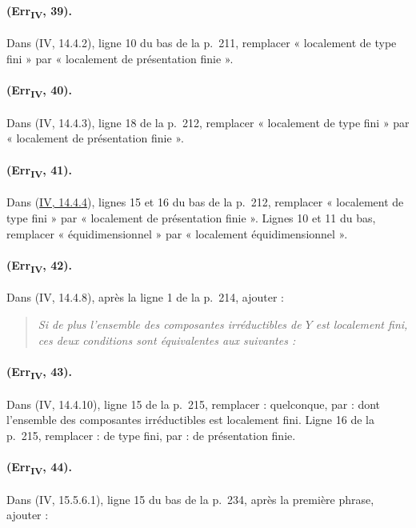 \paragraph{(Err\textsubscript{IV}, 39).}
Dans (IV, 14.4.2), ligne 10 du bas de la p.~211, remplacer « localement
de type fini » par « localement de présentation finie ».

\paragraph{(Err\textsubscript{IV}, 40).}
Dans (IV, 14.4.3), ligne 18 de la p.~212, remplacer « localement de
type fini » par « localement de présentation finie ».

\paragraph{(Err\textsubscript{IV}, 41).}
Dans ({\hyperlink{ega4.c04.cor.14-4-4}{IV, 14.4.4}}), lignes 15 et 16 du
bas de la p.~212, remplacer « localement de type fini » par
« localement de présentation finie ». Lignes 10 et 11 du bas, remplacer
« équidimensionnel » par « localement équidimensionnel ».

\paragraph{(Err\textsubscript{IV}, 42).}
Dans (IV, 14.4.8), après la ligne 1 de la p.~214, ajouter :
\begin{quote}
\emph{Si de plus l'ensemble des composantes irréductibles de $Y$ est
localement fini, ces deux conditions sont équivalentes aux suivantes :}
\end{quote}

\paragraph{(Err\textsubscript{IV}, 43).}
Dans (IV, 14.4.10), ligne 15 de la p.~215, remplacer : quelconque, par :
dont l'ensemble des composantes irréductibles est localement fini.
Ligne 16 de la p.~215, remplacer : de type fini, par : de présentation
finie.

\paragraph{(Err\textsubscript{IV}, 44).}
Dans (IV, 15.5.6.1), ligne 15 du bas de la p.~234, après la première
phrase, ajouter :


